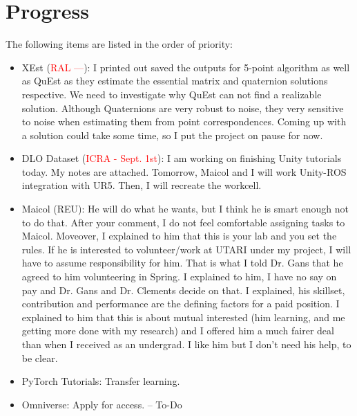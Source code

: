 \documentclass[11pt]{article}
\begin{document}
\section{Progress}
The following items are listed in the order of priority:
\begin{itemize}
    \item XEst (\textcolor{red}{RAL ---}): I printed out saved the outputs for
    5-point algorithm \cite{nister2004efficient} as well as QuEst as they
    estimate the essential matrix and
    quaternion solutions respective. We need to investigate why QuEst can not
    find a realizable solution. Although Quaternions are very robust to noise,
    they very sensitive to noise when estimating them from point correspondences.
    Coming up with a solution could take some time, so I put the project on
    pause for now.
    \item DLO Dataset (\textcolor{red}{ICRA - Sept. 1st}): I am working on
    finishing Unity tutorials today. My notes are attached. Tomorrow, Maicol and
    I will work Unity-ROS integration with UR5. Then, I will recreate the workcell.
    \item Maicol (REU): He will do what he wants, but I think he is smart
    enough not to do that. After your comment, I do not
    feel comfortable assigning tasks to Maicol. Moveover, I explained to him
    that this is your lab and you set the rules. If he is interested to
    volunteer/work at UTARI under my project, I will have to assume
    responsibility for him. That is what I told Dr. Gans that he agreed to
    him volunteering in Spring. I explained to him, I have no say on pay and
    Dr. Gans and Dr. Clements decide on that. I explained, his skillset,
    contribution and performance are the defining factors for a paid position.
    I explained to him that this is about mutual interested (him learning, and
    me getting more done with my research) and I offered him a much fairer deal
    than when I received as an undergrad. I like him but I don't need his help,
    to be clear.
    \item PyTorch Tutorials: Transfer learning.
    \item Omniverse: Apply for access. -- To-Do

  \end{itemize}


\newpage

\newpage


\end{document}
